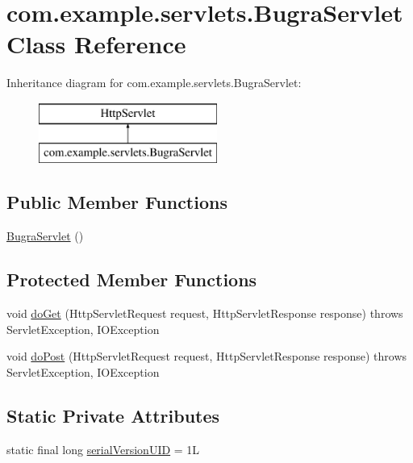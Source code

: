 \hypertarget{classcom_1_1example_1_1servlets_1_1_bugra_servlet}{}\section{com.\+example.\+servlets.\+Bugra\+Servlet Class Reference}
\label{classcom_1_1example_1_1servlets_1_1_bugra_servlet}
Inheritance diagram for com.\+example.\+servlets.\+Bugra\+Servlet\+:\begin{figure}[H]
\begin{center}
\leavevmode
\includegraphics[height=2.000000cm]{classcom_1_1example_1_1servlets_1_1_bugra_servlet}
\end{center}
\end{figure}
\subsection*{Public Member Functions}
\begin{DoxyCompactItemize}
\item 
\hyperlink{classcom_1_1example_1_1servlets_1_1_bugra_servlet_a99bb8aae42b1719184ea8c7d9fee9030}{Bugra\+Servlet} ()
\end{DoxyCompactItemize}
\subsection*{Protected Member Functions}
\begin{DoxyCompactItemize}
\item 
void \hyperlink{classcom_1_1example_1_1servlets_1_1_bugra_servlet_a0874481d6101ca58a052edeb9ce9a815}{do\+Get} (Http\+Servlet\+Request request, Http\+Servlet\+Response response)  throws Servlet\+Exception, I\+O\+Exception 
\item 
void \hyperlink{classcom_1_1example_1_1servlets_1_1_bugra_servlet_a049250502b8d42e00612a0e249b8e3e2}{do\+Post} (Http\+Servlet\+Request request, Http\+Servlet\+Response response)  throws Servlet\+Exception, I\+O\+Exception 
\end{DoxyCompactItemize}
\subsection*{Static Private Attributes}
\begin{DoxyCompactItemize}
\item 
static final long \hyperlink{classcom_1_1example_1_1servlets_1_1_bugra_servlet_a017b832dab85959c1a172b508ce28716}{serial\+Version\+U\+I\+D} = 1\+L
\end{DoxyCompactItemize}


